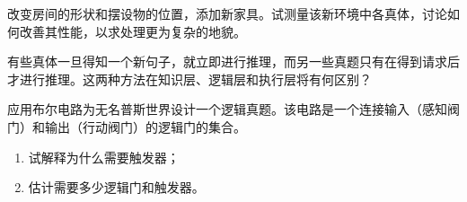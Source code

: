 \begin{question}
改变房间的形状和摆设物的位置，添加新家具。试测量该新环境中各真体，讨论如何改善其性能，以求处理更为复杂的地貌。
\end{question}
\begin{solution}
\end{solution}

\begin{question}
有些真体一旦得知一个新句子，就立即进行推理，而另一些真题只有在得到请求后才进行推理。这两种方法在知识层、逻辑层和执行层将有何区别？
\end{question}
\begin{solution}
\end{solution}

\begin{question}
应用布尔电路为无名普斯世界设计一个逻辑真题。该电路是一个连接输入（感知阀门）和输出（行动阀门）的逻辑门的集合。
	\begin{enumerate}
	\item 试解释为什么需要触发器；
	\item 估计需要多少逻辑门和触发器。
	\end{enumerate}
\end{question}
\begin{solution}
\end{solution}